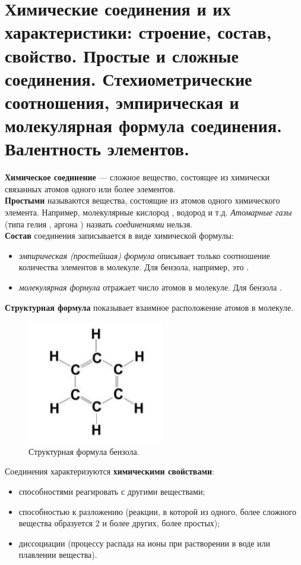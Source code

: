 \section{Химические соединения и их характеристики: строение, состав, свойство. Простые и сложные соединения. Стехиометрические соотношения, эмпирическая и молекулярная формула соединения. Валентность элементов.}

\textbf{Химическое соединение} --- сложное вещество, состоящее из химически связанных атомов одного или более элементов. \\ 

\textbf{Простыми} называются вещества, состоящие из атомов одного химического элемента. Например, молекулярные кислород , водород  и т.д. \textit{Атомарные газы} (типа гелия , аргона ) назвать \textit{соединениями} нельзя.\\

\textbf{Состав} соединения записывается в виде химической формулы: 

\begin{itemize}
	\item \textit{эмпирическая (простейшая) формула} описывает только соотношение количества элементов в молекуле. Для бензола, например, это .
	\item \textit{молекулярная формула} отражает число атомов в молекуле. Для бензола . 
\end{itemize}

\textbf{Структурная формула} показывает взаимное расположение атомов в молекуле.

\begin{figure}[H]
	\centering
	\includegraphics{Pictures/Benzol.jpg}
	\caption{Структурная формула бензола.}
\end{figure}

Соединения характеризуются \textbf{химическими свойствами}: 
\begin{itemize}
	\item способностями реагировать с другими веществами; 
	\item способностью к разложению (реакции, в которой из одного, более
сложного вещества образуется 2 и более других, более простых);
	\item диссоциации (процессу распада на ионы при растворении в воде или плавлении вещества).\\
\end{itemize}

